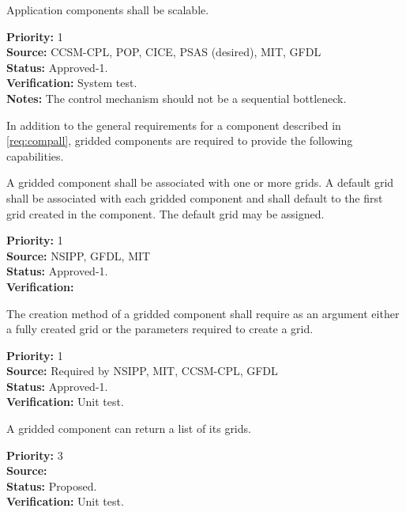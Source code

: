 Application components shall be scalable.

\begin{reqlist}
{\bf Priority:} 1 \\ 
{\bf Source:}  CCSM-CPL, POP, CICE, PSAS (desired), MIT, GFDL \\
{\bf Status:} Approved-1. \\
{\bf Verification:} System test.\\ 
{\bf Notes:}  The control mechanism should not be a sequential bottleneck.
\end{reqlist}


In addition to the general requirements for  a component described in 
\ref{req:compall}, gridded components are required to provide the
following capabilities.

A gridded component shall be associated with one or more grids.
A default grid shall be associated with 
each gridded component and shall default to the first grid created 
in the component.  The default grid may be assigned.
\begin{reqlist}
{\bf Priority:} 1\\
{\bf Source:} NSIPP, GFDL, MIT \\
{\bf Status:} Approved-1.\\
{\bf Verification:} 
\end{reqlist}

The creation method of a gridded component shall require as an 
argument either a fully created grid or the parameters
required to create a grid.
\begin{reqlist}
{\bf Priority:} 1\\
{\bf Source:} Required by NSIPP, MIT, CCSM-CPL, GFDL \\
{\bf Status:} Approved-1. \\
{\bf Verification:} Unit test.
\end{reqlist}


A gridded component can return a list of its grids.
\begin{reqlist}
{\bf Priority:} 3\\
{\bf Source:} \\
{\bf Status:} Proposed. \\
{\bf Verification:} Unit test.
\end{reqlist}

